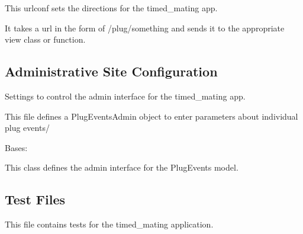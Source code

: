 \documentclass[letterpaper,10pt,english]{sphinxmanual}
\begin{document}
\label{api:module-mousedb.timed_mating.urls}
This urlconf sets the directions for the timed\_mating app.

It takes a url in the form of /plug/something and sends it to the appropriate view class or function.


\subsection{Administrative Site Configuration}
\label{api:id11}\label{api:module-mousedb.timed_mating.admin}
Settings to control the admin interface for the timed\_mating app.

This file defines a PlugEventsAdmin object to enter parameters about individual plug events/

\begin{fulllineitems}
\label{api:mousedb.timed_mating.admin.PlugEventsAdmin}
Bases: 

This class defines the admin interface for the PlugEvents model.

\begin{fulllineitems}
\label{api:mousedb.timed_mating.admin.PlugEventsAdmin.list_display}
\end{fulllineitems}


\begin{fulllineitems}
\label{api:mousedb.timed_mating.admin.PlugEventsAdmin.media}
\end{fulllineitems}


\end{fulllineitems}



\subsection{Test Files}
\label{api:id12}\label{api:module-mousedb.timed_mating.tests}
This file contains tests for the timed\_mating application.
\end{document}
